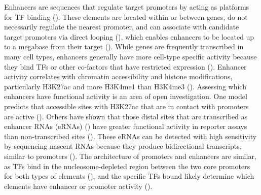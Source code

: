 \documentclass{article}
\begin{document}
{Enhancers are sequences that regulate target promoters by acting as platforms for TF binding (\cite{zabidi_regulatory_2016, long_ever-changing_2016}). These elements are located within or between genes, do not necessarily regulate the nearest promoter, and can associate with candidate target promoters via direct looping (\cite{schoenfelder_long-range_2019}), which enables enhancers to be located up to a megabase from their target (\cite{lettice_disruption_2002}). While genes are frequently transcribed in many cell types, enhancers generally have more cell-type specific activity because they bind TFs or other co-factors that have restricted expression (\cite{andersson_atlas_2014, weikum_glucocorticoid_2017}). Enhancer activity correlates with chromatin accessibility and histone modifications, particularly H3K27ac and more H3K4me1 than H3K4me3 (\cite{heintzman_distinct_2007, ernst_discovery_2010}). Assessing which enhancers have functional activity is an area of open investigation. One model predicts that accessible sites with H3K27ac that are in contact with promoters are active (\cite{fulco_activity-by-contact_2019}). Others have shown that those distal sites that are transcribed as enhancer RNAs (eRNAs) (\cite{ashe_intergenic_1997, de_santa_large_2010, kim_widespread_2010, wang_reprogramming_2011}) have greater functional activity in reporter assays than non-transcribed sites (\cite{henriques_widespread_2018, mikhaylichenko_degree_2018, wissink_nascent_2019}). These eRNAs can be detected with high sensitivity by sequencing nascent RNAs because they produce bidirectional transcripts, similar to promoters (\cite{andersson_atlas_2014, core_analysis_2014, scruggs_bidirectional_2015, mikhaylichenko_degree_2018, wissink_nascent_2019}). The architecture of promoters and enhancers are similar, as TFs bind in the nucleosome-depleted region between the two core promoters for both types of elements (\cite{core_analysis_2014, andersson_unified_2015, tome_single-molecule_2018, tippens_transcription_2020}), and the specific TFs bound likely determine which elements have enhancer or promoter activity (\cite{andersson_determinants_2020}). 

}
\end{document}
